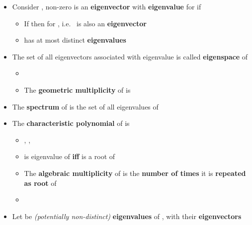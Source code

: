 \begin{itemize}

\item
  Consider , non-zero
   is an \textbf{eigenvector} with
  \textbf{eigenvalue}  for  if

  \begin{itemize}
  
  \item
    If  then
     for
    , i.e.~ is also an
    \textbf{eigenvector}
  \item
     has at most  distinct \textbf{eigenvalues}
  \end{itemize}
\item
  The set of all eigenvectors associated with eigenvalue \iMbox{\lambda}
  is called \textbf{eigenspace}  of 

  \begin{itemize}
  
  \item
  \item
    The \textbf{geometric multiplicity} of \iMbox{\lambda} is
  \end{itemize}
\item
  The \textbf{spectrum}
   of  is
  the set of all eigenvalues of 
\item
  The \textbf{characteristic polynomial} of  is

  \begin{itemize}
  
  \item
    , ,
  \item
     is eigenvalue of 
    \textbf{iff} \iMbox{\lambda} is a root of 
  \item
    The \textbf{algebraic multiplicity} of \iMbox{\lambda} is the
    \textbf{number of times} it is \textbf{repeated as root} of
  \item
  \end{itemize}
\item
  Let  be
  \emph{(potentially non-distinct)} \textbf{eigenvalues} of ,
  with 
  their \textbf{eigenvectors}


\end{itemize}
